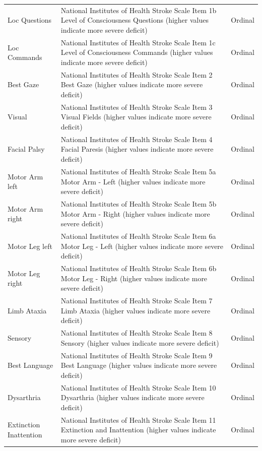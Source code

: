\documentclass[12pt,a4paper, pdftex]{elsarticle}
\begin{document}
\begin{longtable}{|l|p{8.5cm}|c|}
        Loc Questions & National Institutes of Health Stroke Scale Item 1b Level of Consciousness Questions (higher values indicate more severe deficit) & Ordinal \\
        Loc Commands & National Institutes of Health Stroke Scale Item 1c Level of Consciousness Commands (higher values indicate more severe deficit) & Ordinal \\
        Best Gaze & National Institutes of Health Stroke Scale Item 2 Best Gaze (higher values indicate more severe deficit) & Ordinal \\
        Visual & National Institutes of Health Stroke Scale Item 3 Visual Fields (higher values indicate more severe deficit) & Ordinal \\
        Facial Palsy & National Institutes of Health Stroke Scale Item 4 Facial Paresis (higher values indicate more severe deficit) & Ordinal \\
        Motor Arm left & National Institutes of Health Stroke Scale Item 5a Motor Arm - Left (higher values indicate more severe deficit) & Ordinal \\
        Motor Arm right & National Institutes of Health Stroke Scale Item 5b Motor Arm - Right (higher values indicate more severe deficit) & Ordinal \\
        Motor Leg left & National Institutes of Health Stroke Scale Item 6a Motor Leg - Left (higher values indicate more severe deficit) & Ordinal \\
        Motor Leg right & National Institutes of Health Stroke Scale Item 6b Motor Leg - Right (higher values indicate more severe deficit) & Ordinal \\
        Limb Ataxia & National Institutes of Health Stroke Scale Item 7 Limb Ataxia (higher values indicate more severe deficit) & Ordinal \\
        Sensory & National Institutes of Health Stroke Scale Item 8 Sensory (higher values indicate more severe deficit) & Ordinal \\
        Best Language & National Institutes of Health Stroke Scale Item 9 Best Language (higher values indicate more severe deficit) & Ordinal \\
        Dysarthria & National Institutes of Health Stroke Scale Item 10 Dysarthria (higher values indicate more severe deficit) & Ordinal \\
        Extinction Inattention & National Institutes of Health Stroke Scale Item 11 Extinction and Inattention (higher values indicate more severe deficit) & Ordinal \\

\end{longtable}
\end{document}
